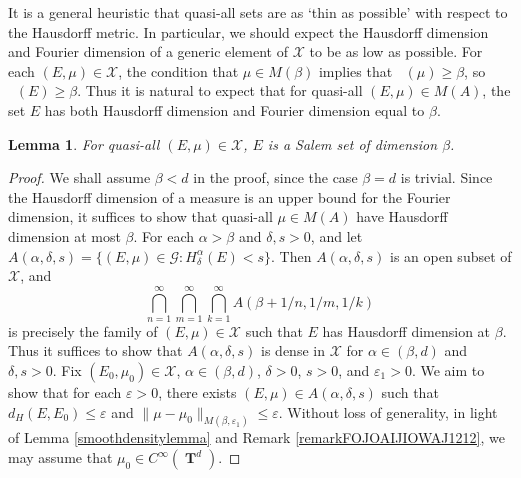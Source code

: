 \documentclass[12pt,reqno]{article}
\numberwithin{equation}{section}
\DeclareMathOperator{\hausdim}{\dim_{\mathbf{H}}}
\DeclareMathOperator{\fordim}{\dim_{\mathbf{F}}}
\DeclareMathOperator{\TT}{\mathbf{T}}
\newtheorem{lemma}{Lemma}
\begin{document}
It is a general heuristic that quasi-all sets are as `thin as possible' with respect to the Hausdorff metric. In particular, we should expect the Hausdorff dimension and Fourier dimension of a generic element of $\mathcal{X}$ to be as low as possible. For each $(E,\mu) \in \mathcal{X}$, the condition that $\mu \in M(\beta)$ implies that $\fordim(\mu) \geq \beta$, so $\fordim(E) \geq \beta$. Thus it is natural to expect that for quasi-all $(E,\mu) \in M(A)$, the set $E$ has both Hausdorff dimension and Fourier dimension equal to $\beta$.

\begin{lemma}
    For quasi-all $(E,\mu) \in \mathcal{X}$, $E$ is a Salem set of dimension $\beta$.
\end{lemma}
\begin{proof}
    We shall assume $\beta < d$ in the proof, since the case $\beta = d$ is trivial. Since the Hausdorff dimension of a measure is an upper bound for the Fourier dimension, it suffices to show that quasi-all $\mu \in M(A)$ have Hausdorff dimension at most $\beta$. For each $\alpha > \beta$ and $\delta, s > 0$, and let $A(\alpha,\delta,s) = \{ (E,\mu) \in \mathcal{G}: H^\alpha_\delta(E) < s \}$. Then $A(\alpha,\delta,s)$ is an open subset of $\mathcal{X}$, and
    \[ \bigcap_{n = 1}^\infty \bigcap_{m = 1}^\infty \bigcap_{k = 1}^\infty A(\beta + 1/n, 1/m, 1/k) \]
    is precisely the family of $(E,\mu) \in \mathcal{X}$ such that $E$ has Hausdorff dimension at $\beta$.
%
    Thus it suffices to show that $A(\alpha,\delta,s)$ is dense in $\mathcal{X}$ for $\alpha \in (\beta,d)$ and $\delta, s > 0$. Fix $(E_0,\mu_0) \in \mathcal{X}$, $\alpha \in (\beta,d)$, $\delta > 0$, $s > 0$, and $\varepsilon_1 > 0$. We aim to show that for each $\varepsilon > 0$, there exists $(E,\mu) \in A(\alpha,\delta,s)$ such that $d_H(E,E_0) \leq \varepsilon$ and $\| \mu - \mu_0 \|_{M(\beta,\varepsilon_1)} \leq \varepsilon$. Without loss of generality, in light of Lemma \ref{smoothdensitylemma} and Remark \ref{remarkFOJOAIJIOWAJ1212}, we may assume that $\mu_0 \in C^\infty(\TT^d)$.


\end{proof}
\end{document}
